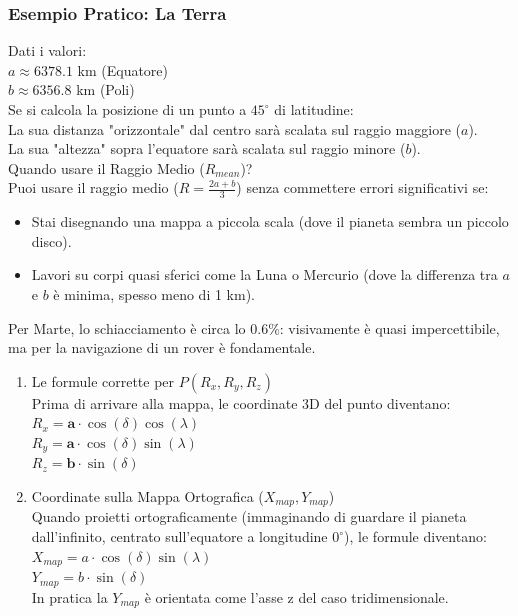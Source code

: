 \documentclass[a4paper,14pt]{article}
\begin{document}
\subsubsection{Esempio Pratico: La Terra}
Dati i valori:\\
\(a\approx 6378.1\) km (Equatore)\\
\(b\approx 6356.8\) km (Poli)\\
Se si calcola la posizione di un punto a \(45^{\circ }\) di latitudine:\\
La sua distanza "orizzontale" dal centro sarà scalata sul raggio maggiore (\(a\)).\\
La sua "altezza" sopra l'equatore sarà scalata sul raggio minore (\(b\)).\\
Quando usare il Raggio Medio (\(R_{mean}\))?\\
Puoi usare il raggio medio (\(R=\frac{2a+b}{3}\)) senza commettere errori significativi se:\\
\begin{itemize}
\item Stai disegnando una mappa a piccola scala (dove il pianeta sembra un piccolo disco).\\
\item Lavori su corpi quasi sferici come la Luna o Mercurio (dove la differenza tra \(a\) e \(b\) è minima, spesso meno di 1 km).\\
\end{itemize}
Per Marte, lo schiacciamento è circa lo \(0.6\%\): visivamente è quasi impercettibile, ma per la navigazione di un rover è fondamentale.
\begin{enumerate}
\item Le formule corrette per \(P(R_{x},R_{y},R_{z})\)\\
Prima di arrivare alla mappa, le coordinate 3D del punto diventano:\\
\(R_{x}=\mathbf{a}\cdot \cos (\delta )\cos (\lambda )\)\\
\(R_{y}=\mathbf{a}\cdot \cos (\delta )\sin (\lambda )\)\\
\(R_{z}=\mathbf{b}\cdot \sin (\delta )\)\\
\clearpage
\item Coordinate sulla Mappa Ortografica (\(X_{map},Y_{map}\))\\
Quando proietti ortograficamente (immaginando di guardare il pianeta dall'infinito, centrato sull'equatore a longitudine \(0^{\circ }\)), le formule diventano:\\
\(X_{map}=a\cdot \cos (\delta )\sin (\lambda )\)\\
\(Y_{map}=b\cdot \sin (\delta )\)\\
In pratica la \(Y_{map}\) è orientata come l'asse z del caso tridimensionale.
\end{enumerate}
\end{document}
